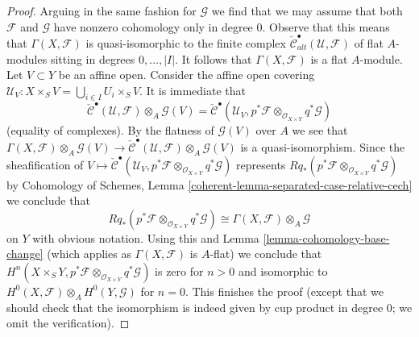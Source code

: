 \begin{proof}
\medskip\noindent
Arguing in the same fashion for $\mathcal{G}$ we find that we
may assume that both $\mathcal{F}$ and $\mathcal{G}$
have nonzero cohomology only in degree $0$.
Observe that this means that $\Gamma(X, \mathcal{F})$
is quasi-isomorphic to the finite complex
$\check{\mathcal{C}}_{alt}^\bullet(\mathcal{U}, \mathcal{F})$
of flat $A$-modules sitting in degrees $0, \ldots, |I|$.
It follows that $\Gamma(X, \mathcal{F})$ is a flat $A$-module.
Let $V \subset Y$ be an affine open. Consider the affine open covering
$\mathcal{U}_V : X \times_S V = \bigcup_{i \in I} U_i \times_S V$.
It is immediate that
$$
\check{\mathcal{C}}^\bullet(\mathcal{U}, \mathcal{F})
\otimes_A \mathcal{G}(V) =
\check{\mathcal{C}}^\bullet(\mathcal{U}_V,
p^*\mathcal{F} \otimes_{\mathcal{O}_{X \times Y}}
q^*\mathcal{G})
$$
(equality of complexes). By the flatness of $\mathcal{G}(V)$
over $A$ we see that
$\Gamma(X, \mathcal{F}) \otimes_A \mathcal{G}(V) \to
\check{\mathcal{C}}^\bullet(\mathcal{U}, \mathcal{F})
\otimes_A \mathcal{G}(V)$ is a quasi-isomorphism.
Since the sheafification of
$V \mapsto \check{\mathcal{C}}^\bullet(\mathcal{U}_V,
p^*\mathcal{F} \otimes_{\mathcal{O}_{X \times Y}}
q^*\mathcal{G})$ represents
$Rq_*(p^*\mathcal{F} \otimes_{\mathcal{O}_{X \times Y}} q^*\mathcal{G})$
by Cohomology of Schemes, Lemma
\ref{coherent-lemma-separated-case-relative-cech}
we conclude that
$$
Rq_*(p^*\mathcal{F} \otimes_{\mathcal{O}_{X \times Y}} q^*\mathcal{G})
\cong
\Gamma(X, \mathcal{F}) \otimes_A \mathcal{G}
$$
on $Y$ with obvious notation. Using this and
Lemma \ref{lemma-cohomology-base-change} (which applies as
$\Gamma(X, \mathcal{F})$ is $A$-flat) we conclude that
$H^n(X \times_S Y, p^*\mathcal{F} \otimes_{\mathcal{O}_{X \times Y}}
q^*\mathcal{G})$ is zero for $n > 0$ and isomorphic to
$H^0(X, \mathcal{F}) \otimes_A H^0(Y, \mathcal{G})$ for $n = 0$.
This finishes the proof (except that we should check that the
isomorphism is indeed given by cup product in degree $0$; we omit
the verification).
\end{proof}

